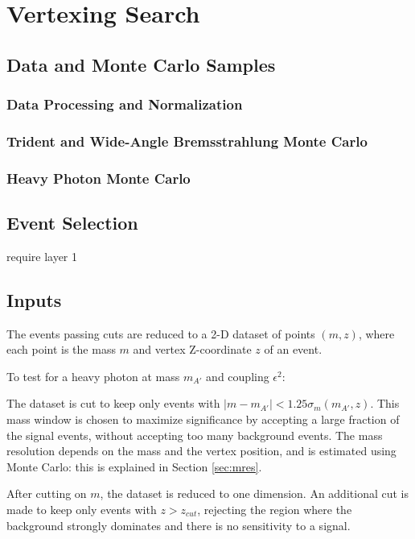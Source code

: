 \chapter{Vertexing Search}

\section{Data and Monte Carlo Samples}

\subsection{Data Processing and Normalization}

\subsection{Trident and Wide-Angle Bremsstrahlung Monte Carlo}

\subsection{Heavy Photon Monte Carlo}
\label{sec:ap_mc}
\section{Event Selection}
require layer 1

\section{Inputs}
The events passing cuts are reduced to a 2-D dataset of points $(m,z)$, where each point is the mass $m$ and vertex Z-coordinate $z$ of an event.




To test for a heavy photon at mass $m_{A'}$ and coupling $\epsilon^2$:

The dataset is cut to keep only events with $|m-m_{A'}|<1.25 \sigma_m(m_{A'},z)$.
This mass window is chosen to maximize significance by accepting a large fraction of the signal events, without accepting too many background events.
The mass resolution depends on the mass and the vertex position, and is estimated using Monte Carlo: this is explained in Section \ref{sec:mres}.

After cutting on $m$, the dataset is reduced to one dimension.
An additional cut is made to keep only events with $z>z_{cut}$, rejecting the region where the background strongly dominates and there is no sensitivity to a signal.

